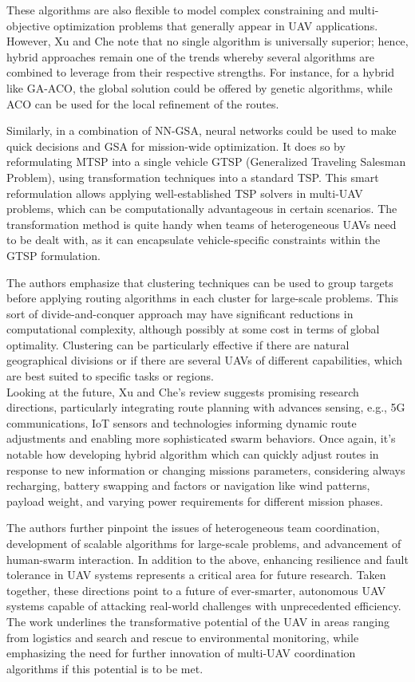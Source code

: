\documentclass[conference]{IEEEtran}
\begin{document}
These algorithms are also flexible to model complex constraining and multi-objective optimization problems that generally appear in UAV applications. However, Xu and Che note that no single algorithm is universally superior; hence, hybrid approaches remain one of the trends whereby several algorithms are combined to leverage from their respective strengths. For instance, for a hybrid like GA-ACO, the global solution could be offered by genetic algorithms, while ACO can be used for the local refinement of the routes. 

Similarly, in a combination of NN-GSA, neural networks could be used to make quick decisions and GSA for mission-wide optimization. It does so by reformulating MTSP into a single vehicle GTSP (Generalized Traveling Salesman Problem), using transformation techniques into a standard TSP. This smart reformulation allows applying well-established TSP solvers in multi-UAV problems, which can be computationally advantageous in certain scenarios. The transformation method is quite handy when teams of heterogeneous UAVs need to be dealt with, as it can encapsulate vehicle-specific constraints within the GTSP formulation.

The authors emphasize that clustering techniques can be used to group targets before applying routing algorithms in each cluster for large-scale problems. This sort of divide-and-conquer approach may have significant reductions in computational complexity, although possibly at some cost in terms of global optimality. Clustering can be particularly effective if there are natural geographical divisions or if there are several UAVs of different capabilities, which are best suited to specific tasks or regions. \\

Looking at the future, Xu and Che's review suggests promising research directions, particularly integrating route planning with advances sensing, e.g., 5G communications, IoT sensors and technologies informing dynamic route adjustments and enabling more sophisticated swarm behaviors.  Once again, it's notable how developing hybrid algorithm which can quickly adjust routes in response to new information or changing missions parameters, considering always recharging, battery swapping and factors or navigation like wind patterns, payload weight, and varying power requirements for different mission phases.

The authors further pinpoint the issues of heterogeneous team coordination, development of scalable algorithms for large-scale problems, and advancement of human-swarm interaction. In addition to the above, enhancing resilience and fault tolerance in UAV systems represents a critical area for future research.
Taken together, these directions point to a future of ever-smarter, autonomous UAV systems capable of attacking real-world challenges with unprecedented efficiency. The work underlines the transformative potential of the UAV in areas ranging from logistics and search and rescue to environmental monitoring, while emphasizing the need for further innovation of multi-UAV coordination algorithms if this potential is to be met.
\end{document}
